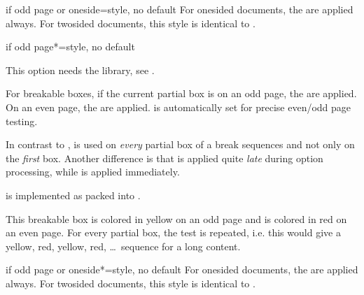 \begin{docTcbKey}[][doc new=2016-11-18]{if odd page or oneside}{=}{style, no default}
  For onesided documents, the  are applied always.
  For twosided documents, this style is identical to .
\end{docTcbKey}


\clearpage
\begin{docTcbKey}[][doc new=2015-11-13]{if odd page*}{=}{style, no default}
\begin{marker}
This option needs the  library, see .
\end{marker}
For breakable boxes, if the current partial box is on an odd page, the  are applied.
On an even page, the  are applied.
 is automatically set for precise even/odd page testing.

In contrast to ,  is used
on \emph{every} partial box of a break sequences and not only on the
\emph{first} box. Another difference is that 
is applied quite \emph{late} during option processing, while
 is applied immediately.

 is implemented as 
packed into .

\begin{dispExample}
\begin{tcolorbox}[breakable,if odd page*={colback=yellow!50}{colback=red!50}]
  This breakable box is colored in yellow on an odd page
  and is colored in red on an even page. For every partial box, the
  test is repeated, i.e. this would give a yellow, red, yellow, red, \ldots\
  sequence for a long content.
\end{tcolorbox}
\end{dispExample}
\end{docTcbKey}


\begin{docTcbKey}[][doc new=2016-11-18]{if odd page or oneside*}{=}{style, no default}
  For onesided documents, the \meta{odd options} are applied always.
  For twosided documents, this style is identical to .
\end{docTcbKey}


